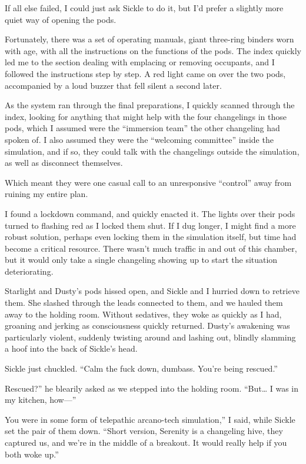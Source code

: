 If all else failed, I could just ask Sickle to do it, but I’d prefer a slightly more quiet way of opening the pods.

Fortunately, there was a set of operating manuals, giant three-ring binders worn with age, with all the instructions on the functions of the pods. The index quickly led me to the section dealing with emplacing or removing occupants, and I followed the instructions step by step. A red light came on over the two pods, accompanied by a loud buzzer that fell silent a second later.

As the system ran through the final preparations, I quickly scanned through the index, looking for anything that might help with the four changelings in those pods, which I assumed were the “immersion team” the other changeling had spoken of. I also assumed they were the “welcoming committee” inside the simulation, and if so, they could talk with the changelings outside the simulation, as well as disconnect themselves.

Which meant they were one casual call to an unresponsive “control” away from ruining my entire plan.

I found a lockdown command, and quickly enacted it. The lights over their pods turned to flashing red as I locked them shut. If I dug longer, I might find a more robust solution, perhaps even locking them in the simulation itself, but time had become a critical resource. There wasn’t much traffic in and out of this chamber, but it would only take a single changeling showing up to start the situation deteriorating.

Starlight and Dusty’s pods hissed open, and Sickle and I hurried down to retrieve them. She slashed through the leads connected to them, and we hauled them away to the holding room. Without sedatives, they woke as quickly as I had, groaning and jerking as consciousness quickly returned. Dusty’s awakening was particularly violent, suddenly twisting around and lashing out, blindly slamming a hoof into the back of Sickle’s head.

Sickle just chuckled. “Calm the fuck down, dumbass. You’re being rescued.”

\leavevmode{}Rescued?” he blearily asked as we stepped into the holding room. “But… I was in my kitchen, how—”

\leavevmode{}You were in some form of telepathic arcano-tech simulation,” I said, while Sickle set the pair of them down. “Short version, Serenity is a changeling hive, they captured us, and we’re in the middle of a breakout. It would really help if you both woke up.”

